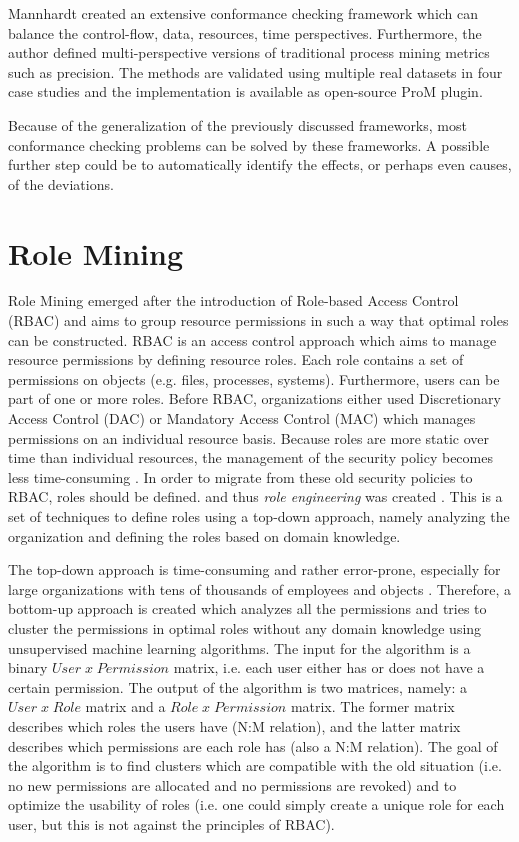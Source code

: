 Mannhardt \cite{Mannhardt2018} created an extensive conformance checking framework which can balance the control-flow, data, resources, time perspectives. Furthermore, the author defined multi-perspective versions of traditional process mining metrics such as precision. The methods are validated using multiple real datasets in four case studies and the implementation is available as open-source ProM plugin. 

Because of the generalization of the previously discussed frameworks, most conformance checking problems can be solved by these frameworks. A possible further step could be to automatically identify the effects, or perhaps even causes, of the deviations. 

\section{Role Mining}\label{section:rolemining} 
Role Mining emerged after the introduction of Role-based Access Control (RBAC) \cite{rbac2,rbac} and aims to group resource permissions in such a way that optimal roles can be constructed. RBAC is an access control approach which aims to manage resource permissions by defining resource roles. Each role contains a set of permissions on objects (e.g. files, processes, systems). Furthermore, users can be part of one or more roles. Before RBAC, organizations either used Discretionary Access Control (DAC) \cite{dac} or Mandatory Access Control (MAC) \cite{mac} which manages permissions on an individual resource basis. Because roles are more static over time than individual resources, the management of the security policy becomes less time-consuming \cite{rbac2,rbac}. In order to migrate from these old security policies to RBAC, roles should be defined. and thus \textit{role engineering} was created \cite{coyne1996role,roeckle2000role}. This is a set of techniques to define roles using a top-down approach, namely analyzing the organization and defining the roles based on domain knowledge. 

The top-down approach is time-consuming and rather error-prone, especially for large organizations with tens of thousands of employees and objects \cite{Kuhlmann2003}. Therefore, a bottom-up approach is created which analyzes all the permissions and tries to cluster the permissions in optimal roles without any domain knowledge using unsupervised machine learning algorithms. The input for the algorithm is a binary $User \; x \; Permission$ matrix, i.e. each user either has or does not have a certain permission. The output of the algorithm is two matrices, namely: a $User \; x\;  Role$ matrix and a $Role\;  x \; Permission$ matrix. The former matrix describes which roles the users have (N:M relation), and the latter matrix describes which permissions are each role has (also a N:M relation). The goal of the algorithm is to find clusters which are compatible with the old situation (i.e. no new permissions are allocated and no permissions are revoked) and to optimize the usability of roles (i.e. one could simply create a unique role for each user, but this is not against the principles of RBAC).

